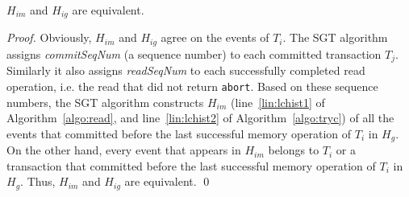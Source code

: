 \documentclass{llncs}
\newcommand{\op} {operation}
\newcommand{\cseq} {\textit{commitSeqNum}}
\newcommand{\rseq} {\textit{readSeqNum}}
\newcommand{\sgt} {SGT}
\newcommand{\memop} {memory operation}
\begin{document}
\begin{lemma}
\label{lem:equiv}
$H_{im}$ and $H_{ig}$ are equivalent.
\end{lemma}
\begin{proof}
Obviously, $H_{im}$ and $H_{ig}$ agree on the events of $T_i$.   
The \sgt{} algorithm assigns \cseq{} (a sequence number) to each
committed transaction $T_j$. 
Similarly it also assigns \rseq{} to each successfully completed read
\op, i.e. the read that did not return \texttt{abort}. 
Based on these sequence numbers, the \sgt{} algorithm constructs
$H_{im}$ (line~\ref{lin:lchist1} of Algorithm~\ref{algo:read},
and line~\ref{lin:lchist2}  of Algorithm~\ref{algo:tryc})
of all the events that committed before the last successful \memop{} of $T_i$ in $H_g$.
On the other hand, every event that appears in $H_{im}$ belongs to $T_i$ 
or a transaction that committed before the last successful \memop{} of $T_i$ in $H_g$.
Thus, $H_{im}$ and $H_{ig}$ are equivalent. \qed
\end{proof}
\end{document}
